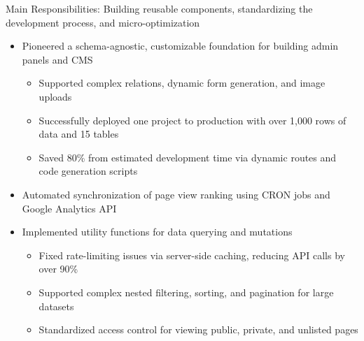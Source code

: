 \documentclass[
  a4paper,
  10pt,
  dvipdfmx
]{article}
\begin{document}
\begin{enumerate}[]
        Main Responsibilities: Building reusable components, standardizing the development process, and micro-optimization
        \begin{itemize}
          \item Pioneered a schema-agnostic, customizable foundation for building admin panels and CMS
                \begin{itemize}
                  \item Supported complex relations, dynamic form generation, and image uploads
                  \item Successfully deployed one project to production with over 1,000 rows of data and 15 tables
                  \item Saved 80\% from estimated development time via dynamic routes and code generation scripts
                \end{itemize}
          \item Automated synchronization of page view ranking using CRON jobs and Google Analytics API
          \item Implemented utility functions for data querying and mutations
                \begin{itemize}
                  \item Fixed rate-limiting issues via server-side caching, reducing API calls by over 90\%
                  \item Supported complex nested filtering, sorting, and pagination for large datasets
                  \item Standardized access control for viewing public, private, and unlisted pages
                \end{itemize}
        \end{itemize}
\end{enumerate}

\end{document}
